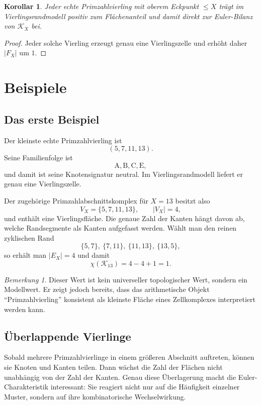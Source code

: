 \documentclass[11pt,a4paper]{article}
\newtheorem{corollary}[theorem]{Korollar}
\theoremstyle{definition}
\theoremstyle{remark}
\newtheorem{remark}[theorem]{Bemerkung}
\newcommand{\Efam}{\mathrm{E}}
\newcommand{\Afam}{\mathrm{A}}
\newcommand{\Bfam}{\mathrm{B}}
\newcommand{\Cfam}{\mathrm{C}}
\newcommand{\VX}{V_X}
\newcommand{\EX}{E_X}
\newcommand{\FX}{F_X}
\newcommand{\KX}{\mathcal{K}_X}
\begin{document}
	\begin{corollary}
		Jeder echte Primzahlvierling mit oberem Eckpunkt $\le X$ trägt im Vierlingsrandmodell positiv zum Flächenanteil und damit direkt zur Euler-Bilanz von $\KX$ bei.
	\end{corollary}
	
	\begin{proof}
		Jeder solche Vierling erzeugt genau eine Vierlingszelle und erhöht daher $|\FX|$ um $1$.
	\end{proof}
	
	\section{Beispiele}
	
	\subsection{Das erste Beispiel}
	
	Der kleinste echte Primzahlvierling ist
	\[
	(5,7,11,13).
	\]
	Seine Familienfolge ist
	\[
	\Afam,\Bfam,\Cfam,\Efam,
	\]
	und damit ist seine Knotensignatur neutral. Im Vierlingsrandmodell liefert er genau eine Vierlingszelle.
	
	Der zugehörige Primzahlabschnittskomplex für $X=13$ besitzt also
	\[
	\VX=\{5,7,11,13\},\qquad |\VX|=4,
	\]
	und enthält eine Vierlingsfläche. Die genaue Zahl der Kanten hängt davon ab, welche Randsegmente als Kanten aufgefasst werden. Wählt man den reinen zyklischen Rand
	\[
	\{5,7\},\ \{7,11\},\ \{11,13\},\ \{13,5\},
	\]
	so erhält man $|\EX|=4$ und damit
	\[
	\chi(\mathcal K_{13})=4-4+1=1.
	\]
	
	\begin{remark}
		Dieser Wert ist kein universeller topologischer Wert, sondern ein Modellwert. Er zeigt jedoch bereits, dass das arithmetische Objekt ``Primzahlvierling'' konsistent als kleinste Fläche eines Zellkomplexes interpretiert werden kann.
	\end{remark}
	
	\subsection{Überlappende Vierlinge}
	
	Sobald mehrere Primzahlvierlinge in einem größeren Abschnitt auftreten, können sie Knoten und Kanten teilen. Dann wächst die Zahl der Flächen nicht unabhängig von der Zahl der Kanten. Genau diese Überlagerung macht die Euler-Charakteristik interessant: Sie reagiert nicht nur auf die Häufigkeit einzelner Muster, sondern auf ihre kombinatorische Wechselwirkung.
	
\end{document}
